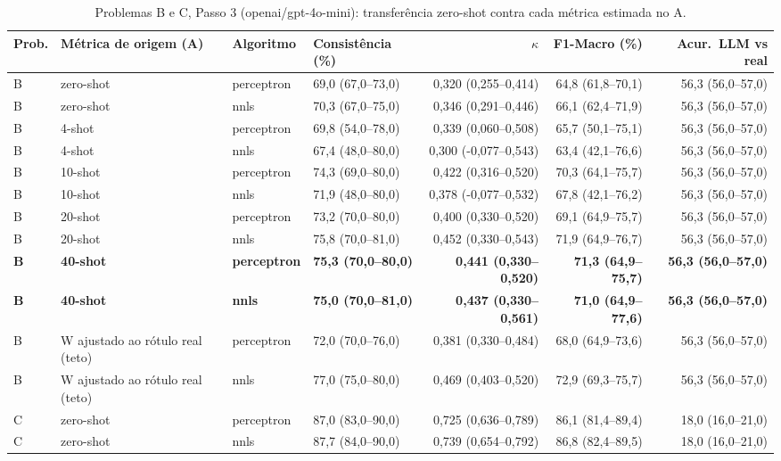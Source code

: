 \begin{table}[htbp]
\centering
\small
\caption{Problemas B e C, Passo 3 (openai/gpt-4o-mini): transferência zero-shot contra cada métrica estimada no A.}
\label{tab:BC_passo3_todas_metricas_A_gpt4mini}
\begin{tabular}{llllrrr}
\toprule
Prob. & Métrica de origem (A) & Algoritmo & Consistência (\%) & $\kappa$ & F1-Macro (\%) & Acur.\ LLM vs real \\
\midrule
B & zero-shot & perceptron & 69,0 (67,0–73,0) & 0,320 (0,255–0,414) & 64,8 (61,8–70,1) & 56,3 (56,0–57,0) \\
B & zero-shot & nnls & 70,3 (67,0–75,0) & 0,346 (0,291–0,446) & 66,1 (62,4–71,9) & 56,3 (56,0–57,0) \\
B & 4-shot & perceptron & 69,8 (54,0–78,0) & 0,339 (0,060–0,508) & 65,7 (50,1–75,1) & 56,3 (56,0–57,0) \\
B & 4-shot & nnls & 67,4 (48,0–80,0) & 0,300 (-0,077–0,543) & 63,4 (42,1–76,6) & 56,3 (56,0–57,0) \\
B & 10-shot & perceptron & 74,3 (69,0–80,0) & 0,422 (0,316–0,520) & 70,3 (64,1–75,7) & 56,3 (56,0–57,0) \\
B & 10-shot & nnls & 71,9 (48,0–80,0) & 0,378 (-0,077–0,532) & 67,8 (42,1–76,2) & 56,3 (56,0–57,0) \\
B & 20-shot & perceptron & 73,2 (70,0–80,0) & 0,400 (0,330–0,520) & 69,1 (64,9–75,7) & 56,3 (56,0–57,0) \\
B & 20-shot & nnls & 75,8 (70,0–81,0) & 0,452 (0,330–0,543) & 71,9 (64,9–76,7) & 56,3 (56,0–57,0) \\
\textbf{B} & \textbf{40-shot} & \textbf{perceptron} & \textbf{75,3 (70,0–80,0)} & \textbf{0,441 (0,330–0,520)} & \textbf{71,3 (64,9–75,7)} & \textbf{56,3 (56,0–57,0)} \\
\textbf{B} & \textbf{40-shot} & \textbf{nnls} & \textbf{75,0 (70,0–81,0)} & \textbf{0,437 (0,330–0,561)} & \textbf{71,0 (64,9–77,6)} & \textbf{56,3 (56,0–57,0)} \\
B & W ajustado ao rótulo real (teto) & perceptron & 72,0 (70,0–76,0) & 0,381 (0,330–0,484) & 68,0 (64,9–73,6) & 56,3 (56,0–57,0) \\
B & W ajustado ao rótulo real (teto) & nnls & 77,0 (75,0–80,0) & 0,469 (0,403–0,520) & 72,9 (69,3–75,7) & 56,3 (56,0–57,0) \\
\midrule
C & zero-shot & perceptron & 87,0 (83,0–90,0) & 0,725 (0,636–0,789) & 86,1 (81,4–89,4) & 18,0 (16,0–21,0) \\
C & zero-shot & nnls & 87,7 (84,0–90,0) & 0,739 (0,654–0,792) & 86,8 (82,4–89,5) & 18,0 (16,0–21,0) \\

\end{tabular}
\end{table}
